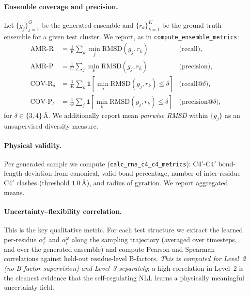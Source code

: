 \documentclass{article}
\theoremstyle{remark}
\theoremstyle{definition}
\begin{document}
\paragraph{Ensemble coverage and precision.}
Let $\{g_j\}_{j=1}^G$ be the generated ensemble and $\{r_k\}_{k=1}^K$ be the
ground-truth ensemble for a given test cluster. We report, as in
\texttt{compute\_ensemble\_metrics}:
\begin{align*}
\mathrm{AMR\text{-}R}&=\tfrac{1}{K}\sum_{k}\min_{j}\mathrm{RMSD}(g_j,r_k)
  &\text{(recall)}, \\
\mathrm{AMR\text{-}P}&=\tfrac{1}{G}\sum_{j}\min_{k}\mathrm{RMSD}(g_j,r_k)
  &\text{(precision)},\\
\mathrm{COV\text{-}R}_\delta&=\tfrac{1}{K}\sum_{k}\mathbf{1}\!\left[\min_{j}
   \mathrm{RMSD}(g_j,r_k)\leq\delta\right]
  &\text{(recall@}\delta\text{)},\\
\mathrm{COV\text{-}P}_\delta&=\tfrac{1}{G}\sum_{j}\mathbf{1}\!\left[\min_{k}
   \mathrm{RMSD}(g_j,r_k)\leq\delta\right]
  &\text{(precision@}\delta\text{)},
\end{align*}
for $\delta\in\{3,4\}$\,\AA. We additionally report mean
\emph{pairwise RMSD} within $\{g_j\}$ as an unsupervised diversity measure.

\paragraph{Physical validity.}
Per generated sample we compute (\texttt{calc\_rna\_c4\_c4\_metrics}):
C4$'$-C4$'$ bond-length deviation from canonical, valid-bond percentage,
number of inter-residue C4$'$ clashes (threshold $1.0$\,\AA), and radius of
gyration. We report aggregated means.

\paragraph{Uncertainty--flexibility correlation.}
This is the key qualitative metric. For each test structure we extract the
learned per-residue $\alpha^x_i$ and $\alpha^\omega_i$ along the sampling
trajectory (averaged over timesteps, and over the generated ensemble) and
compute Pearson and Spearman correlations against held-out residue-level
B-factors. \emph{This is computed for Level~2 (no B-factor supervision) and
Level~3 separately}; a high correlation in Level~2 is the cleanest evidence
that the self-regulating NLL learns a physically meaningful uncertainty field.

\end{document}
